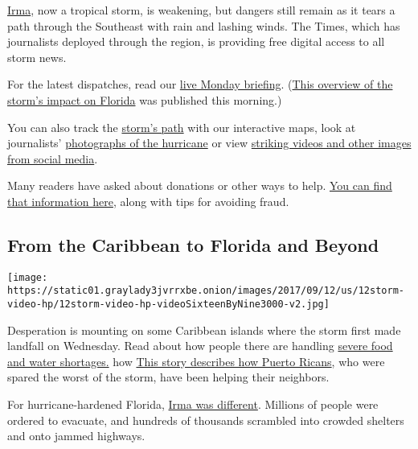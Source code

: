 \href{https://www.nytimes3xbfgragh.onion/2017/09/11/us/hurricane-irma-florida.html}{Irma},
now a tropical storm, is weakening, but dangers still remain as it tears
a path through the Southeast with rain and lashing winds. The Times,
which has journalists deployed through the region, is providing free
digital access to all storm news.

For the latest dispatches, read our
\href{https://www.nytimes3xbfgragh.onion/2017/09/11/us/hurricane-irma-florida.html}{live
Monday briefing}.
(\href{https://www.nytimes3xbfgragh.onion/2017/09/10/us/irma-florida-keys-gulf-coast.html}{This
overview of the storm's impact on Florida} was published this morning.)

You can also track the
\href{https://www.nytimes3xbfgragh.onion/interactive/2017/09/05/us/hurricane-irma-map.html}{storm's
path} with our interactive maps, look at journalists'
\href{https://www.nytimes3xbfgragh.onion/2017/09/09/world/americas/hurricane-irma-photos.html}{photographs
of the hurricane} or view
\href{https://www.nytimes3xbfgragh.onion/2017/09/11/us/irma-videos-damage.html}{striking
videos and other images from social media}.

Many readers have asked about donations or other ways to help.
\href{https://www.nytimes3xbfgragh.onion/2017/09/08/us/hurricane-irma-help-donate.html}{You
can find that information here}, along with tips for avoiding fraud.

\hypertarget{from-the-caribbean-to-florida-and-beyond}{%
\subsection{From the Caribbean to Florida and
Beyond}\label{from-the-caribbean-to-florida-and-beyond}}

\texttt{[image: https://static01.graylady3jvrrxbe.onion/images/2017/09/12/us/12storm-video-hp/12storm-video-hp-videoSixteenByNine3000-v2.jpg]}

Desperation is mounting on some Caribbean islands where the storm first
made landfall on Wednesday. Read about how people there are handling
\href{https://www.nytimes3xbfgragh.onion/2017/09/10/world/americas/irma-caribbean-st-martin.html}{severe
food and water shortages.} how
\href{https://www.nytimes3xbfgragh.onion/2017/09/10/us/puerto-rico-virgin-islands.html}{This
story describes how Puerto Ricans}, who were spared the worst of the
storm, have been helping their neighbors.

For hurricane-hardened Florida,
\href{https://www.nytimes3xbfgragh.onion/2017/09/10/us/key-west-naples-florida.html}{Irma
was different}. Millions of people were ordered to evacuate, and
hundreds of thousands scrambled into crowded shelters and onto jammed
highways.

